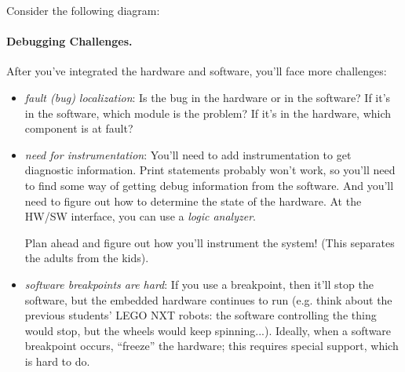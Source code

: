 Consider the following diagram:

\begin{center}
\end{center}

\paragraph{Debugging Challenges.} After you've integrated the hardware
and software, you'll face more challenges:

\begin{itemize}
\item \emph{fault (bug) localization}: Is the bug in the hardware or in the software? If it's in the software, which module is the problem? If it's in the hardware, which component is at fault?
\item \emph{need for instrumentation}: You'll need to add instrumentation to get diagnostic information. Print statements probably won't work, so you'll need 
to find some way of getting debug information from the software. And you'll
need to figure out how to determine the state of the hardware. At the
HW/SW interface, you can use a \emph{logic analyzer}.

Plan ahead and figure out how you'll instrument the system! (This separates the adults from the kids).

\item \emph{software breakpoints are hard}: If you use a breakpoint, then
it'll stop the software, but the embedded hardware continues to run (e.g.
think about the previous students' LEGO NXT robots: the software controlling the thing would stop, but the wheels would keep spinning...). Ideally, when a software breakpoint
occurs, ``freeze'' the hardware; this requires special support, which 
is hard to do.
\end{itemize}

